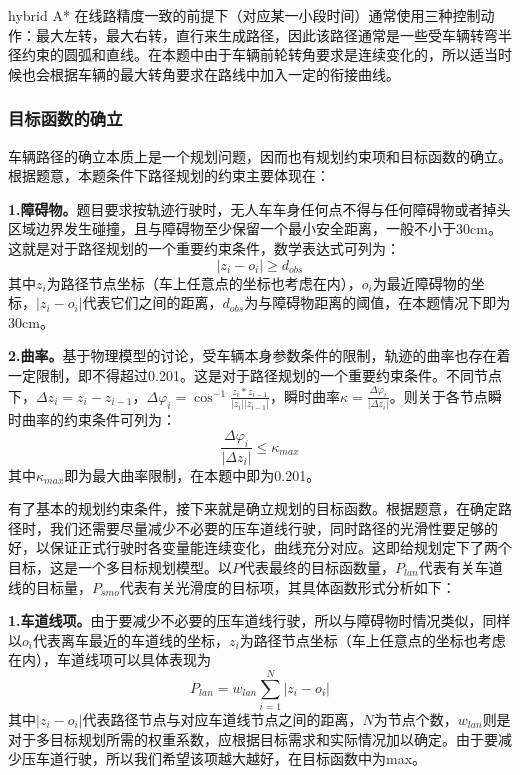 \documentclass{article}
\begin{document}
    hybrid A* 在线路精度一致的前提下（对应某一小段时间）通常使用三种控制动作：最大左转，最大右转，直行来生成路径，因此该路径通常是一些受车辆转弯半径约束的圆弧和直线。在本题中由于车辆前轮转角要求是连续变化的，所以适当时候也会根据车辆的最大转角要求在路线中加入一定的衔接曲线。
    \subsubsection{目标函数的确立}
    车辆路径的确立本质上是一个规划问题，因而也有规划约束项和目标函数的确立。根据题意，本题条件下路径规划的约束主要体现在：
    
    \textbf{1.障碍物。}题目要求按轨迹行驶时，无人车车身任何点不得与任何障碍物或者掉头区域边界发生碰撞，且与障碍物至少保留一个最小安全距离，一般不小于30cm。这就是对于路径规划的一个重要约束条件，数学表达式可列为：
        \begin{equation}
    |z_{i}-o_{i}|\geq d_{obs}
    \end{equation}
	其中$z_{i}$为路径节点坐标（车上任意点的坐标也考虑在内），$o_{i}$为最近障碍物的坐标，$|z_{i}-o_{i}|$代表它们之间的距离，$d_{obs}$为与障碍物距离的阈值，在本题情况下即为30cm。

    \textbf{2.曲率。}基于物理模型的讨论，受车辆本身参数条件的限制，轨迹的曲率也存在着一定限制，即不得超过0.201。这是对于路径规划的一个重要约束条件。不同节点下，$\Delta z_{i}=z_{i}-z_{i-1}$，$\Delta\varphi_{i}=\cos^{-1}\frac{z_{i}*z_{i-1}}{|z_{i}||z_{i-1}|}$，瞬时曲率$\kappa=\frac{\Delta \varphi_{i}}{|\Delta z_{i}|}$。则关于各节点瞬时曲率的约束条件可列为：
   \begin{equation}
   	\frac{\Delta \varphi_{i}}{|\Delta z_{i}|}\leq \kappa_{max}
   \end{equation} 
	其中$\kappa_{max}$即为最大曲率限制，在本题中即为0.201。

    有了基本的规划约束条件，接下来就是确立规划的目标函数。根据题意，在确定路径时，我们还需要尽量减少不必要的压车道线行驶，同时路径的光滑性要足够的好，以保证正式行驶时各变量能连续变化，曲线充分对应。这即给规划定下了两个目标，这是一个多目标规划模型。以$P$代表最终的目标函数量，$P_{lan}$代表有关车道线的目标量，$P_{smo}$代表有关光滑度的目标项，其具体函数形式分析如下：
    
    \textbf{1.车道线项。}由于要减少不必要的压车道线行驶，所以与障碍物时情况类似，同样以$o_{i}$代表离车最近的车道线的坐标，$z_{i}$为路径节点坐标（车上任意点的坐标也考虑在内），车道线项可以具体表现为
       \begin{equation}
     P_{lan}=w_{lan}\sum_{i=1}^{N}|z_{i}-o_{i}|
    \end{equation}
	其中$|z_{i}-o_{i}|$代表路径节点与对应车道线节点之间的距离，$N$为节点个数，$w_{lan}$则是对于多目标规划所需的权重系数，应根据目标需求和实际情况加以确定。由于要减少压车道行驶，所以我们希望该项越大越好，在目标函数中为max。
\end{document}
